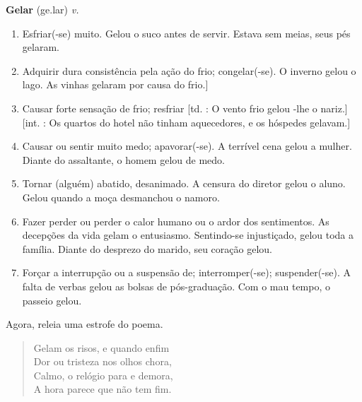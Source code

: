 \begin{myquote}
\textbf{Gelar} (ge.lar)
\textit{v.}

\begin{enumerate}
\item Esfriar(-se) muito.
Gelou o suco antes de servir.
Estava sem meias, seus pés gelaram.

\item Adquirir dura consistência pela ação do frio; congelar(-se).
O inverno gelou o lago.
As vinhas gelaram por causa do frio.]

\item Causar forte sensação de frio; resfriar [td. : O vento frio gelou -lhe o nariz.] [int. : Os quartos do hotel não tinham aquecedores, e os hóspedes gelavam.]

\item Causar ou sentir muito medo; apavorar(-se).
A terrível cena gelou a mulher.
Diante do assaltante, o homem gelou de medo.

\item Tornar (alguém) abatido, desanimado.
A censura do diretor gelou o aluno.
Gelou quando a moça desmanchou o namoro.

\item Fazer perder ou perder o calor humano ou o ardor dos sentimentos.
As decepções da vida gelam o entusiasmo.
Sentindo-se injustiçado, gelou toda a família.
Diante do desprezo do marido, seu coração gelou.

\item Forçar a interrupção ou a suspensão de; interromper(-se); suspender(-se).
A falta de verbas gelou as bolsas de pós-graduação.
Com o mau tempo, o passeio gelou.
\end{enumerate}

\end{myquote}

Agora, releia uma estrofe do poema.

\begin{myquote}
\begin{verse}
Gelam os risos, e quando enfim\\
Dor ou tristeza nos olhos chora,\\
Calmo, o relógio para e demora,\\
A hora parece que não tem fim.\\

\end{verse}
\end{myquote}

